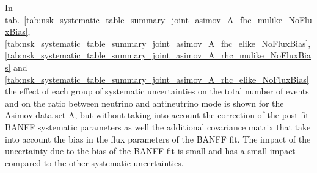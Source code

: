 
In tab.~\ref{tab:nsk_systematic_table_summary_joint_asimov_A_fhc_mulike_NoFluxBias},
\ref{tab:nsk_systematic_table_summary_joint_asimov_A_fhc_elike_NoFluxBias},
\ref{tab:nsk_systematic_table_summary_joint_asimov_A_rhc_mulike_NoFluxBias}
and
\ref{tab:nsk_systematic_table_summary_joint_asimov_A_rhc_elike_NoFluxBias}
the effect of each group of systematic uncertainties 
on the total number of events and on the ratio 
between neutrino and antineutrino mode is shown for the Asimov data set A,
but without taking into account the correction of the post-fit BANFF systematic
parameters as well the additional covariance matrix that take into account
the bias in the flux parameters of the BANFF fit.
The impact of the uncertainty due to the bias of the BANFF fit is small
and has a small impact compared to the other systematic uncertainties.










